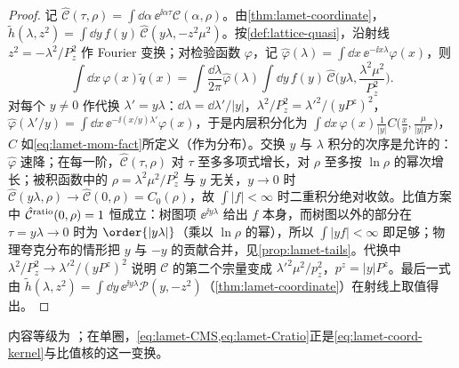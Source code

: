 \begin{proof}
记 $\hat{\mathcal C}(\tau,\rho)=\int\dd\alpha\,\ee^{\ii\alpha\tau}\mathcal C(\alpha,\rho)$。由\cref{thm:lamet-coordinate}，$\tilde h(\lambda,z^2)=\int\dd y\,f(y)\,\hat{\mathcal C}(y\lambda,-z^2\mu^2)$。按\cref{def:lattice-quasi}，沿射线 $z^2=-\lambda^2/P_z^2$ 作 Fourier 变换；对检验函数 $\varphi$，记 $\hat\varphi(\lambda)=\int\dd x\,\ee^{-\ii x\lambda}\varphi(x)$，则
\[
\int\dd x\,\varphi(x)\tilde q(x)=\int\frac{\dd\lambda}{2\pi}\hat\varphi(\lambda)\int\dd y\,f(y)\,\hat{\mathcal C}\Big(y\lambda,\frac{\lambda^2\mu^2}{P_z^2}\Big).
\]
对每个 $y\neq0$ 作代换 $\lambda'=y\lambda$：$\dd\lambda=\dd\lambda'/|y|$，$\lambda^2/P_z^2=\lambda'^2/(yP^z)^2$，$\hat\varphi(\lambda'/y)=\int\dd x\,\ee^{-\ii(x/y)\lambda'}\varphi(x)$，于是内层积分化为 $\int\dd x\,\varphi(x)\frac1{|y|}C\big(\frac xy,\frac\mu{|y|P^z}\big)$，$C$ 如\cref{eq:lamet-mom-fact}所定义（作为分布）。交换 $y$ 与 $\lambda$ 积分的次序是允许的：$\hat\varphi$ 速降；在每一阶，$\hat{\mathcal C}(\tau,\rho)$ 对 $\tau$ 至多多项式增长，对 $\rho$ 至多按 $\ln\rho$ 的幂次增长；被积函数中的 $\rho=\lambda^2\mu^2/P_z^2$ 与 $y$ 无关，$y\to0$ 时 $\hat{\mathcal C}(y\lambda,\rho)\to\hat{\mathcal C}(0,\rho)=C_0(\rho)$，故 $\int|f|<\infty$ 时二重积分绝对收敛。比值方案中 $\hat{\mathcal C}^{\rm ratio}(0,\rho)=1$ 恒成立：树图项 $\ee^{\ii y\lambda}$ 给出 $f$ 本身，而树图以外的部分在 $\tau=y\lambda\to0$ 时为 $\order{|y\lambda|}$（乘以 $\ln\rho$ 的幂），所以 $\int|yf|<\infty$ 即足够；物理夸克分布的情形把 $y$ 与 $-y$ 的贡献合并，见\cref{prop:lamet-tails}。代换中 $\lambda^2/P_z^2\to\lambda'^2/(yP^z)^2$ 说明 $\mathcal C$ 的第二个宗量变成 $\lambda'^2\mu^2/p_z^2$，$p^z=|y|P^z$。最后一式由 $\tilde h(\lambda,z^2)=\int\dd y\,\ee^{\ii y\lambda}\mathcal P(y,-z^2)$（\cref{thm:lamet-coordinate}）在射线上取值得出。
\end{proof}

内容等级为 \tagA；在单圈，\cref{eq:lamet-CMS,eq:lamet-Cratio}正是\cref{eq:lamet-coord-kernel}与比值核的这一变换。

